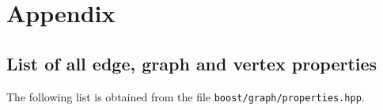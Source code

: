 \chapter{Appendix}

\section{List of all edge, graph and vertex properties}
\label{subsec:all_properties}

The following list is obtained from the file \verb;boost/graph/properties.hpp;.

